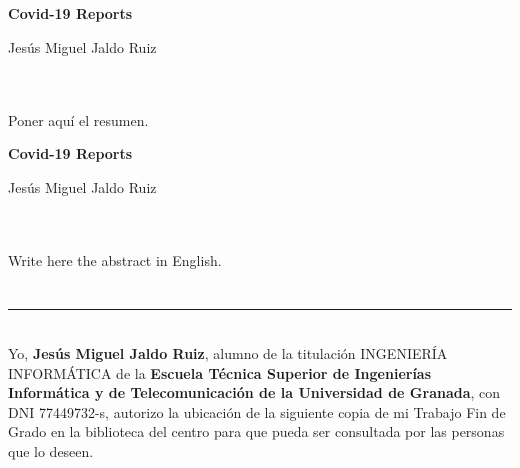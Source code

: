 \chapter*{}

\thispagestyle{empty}

\begin{center}
{\large\bfseries Covid-19 Reports}\\
\end{center}
\begin{center}
Jesús Miguel Jaldo Ruiz\\
\end{center}

\\

\vspace{0.7cm}
\\

Poner aquí el resumen.
\cleardoublepage


\thispagestyle{empty}


\begin{center}
{\large\bfseries Covid-19 Reports}\\
\end{center}
\begin{center}
Jesús Miguel Jaldo Ruiz\\
\end{center}

\\

\vspace{0.7cm}
\\

Write here the abstract in English.

\chapter*{}
\thispagestyle{empty}

\noindent\rule[-1ex]{\textwidth}{2pt}\\[4.5ex]

Yo, \textbf{Jesús Miguel Jaldo Ruiz}, alumno de la titulación INGENIERÍA INFORMÁTICA de la \textbf{Escuela Técnica Superior
de Ingenierías Informática y de Telecomunicación de la Universidad de Granada}, con DNI 77449732-s, autorizo la
ubicación de la siguiente copia de mi Trabajo Fin de Grado en la biblioteca del centro para que pueda ser
consultada por las personas que lo deseen.


